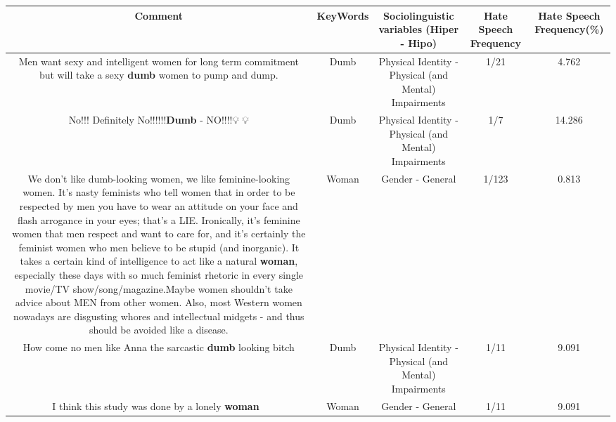 \documentclass[11pt]{article}
\newlength\mylength
\begin{document}
\begin{center}
\setlength\mylength{\dimexpr\textwidth - 1\arrayrulewidth - 50\tabcolsep}
\begin{longtable}{|C{.65\mylength}|C{.30\mylength}|C{.12\mylength}|C{.12\mylength}|C{.12\mylength}|}
\hline
\textbf{Comment} & \textbf{KeyWords} & \textbf{Sociolinguistic variables (Hiper - Hipo)}  & \textbf{Hate Speech Frequency} & \textbf{Hate Speech Frequency(\%)} \\
\hline{}\small Men want sexy and intelligent women for long term commitment but will take a sexy \textbf{dumb} women to pump and dump.\normalsize   & Dumb & Physical Identity - Physical (and Mental) Impairments & 1/21 & 4.762 \\  \hline
  \small No!!! Definitely No!!!!!!\textbf{Dumb} - NO!!!!💡🤨💡\normalsize   & Dumb & Physical Identity - Physical (and Mental) Impairments & 1/7 & 14.286 \\  \hline
  \small We don't like dumb-looking women, we like feminine-looking women. It's nasty feminists who tell women that in order to be respected by men you have to wear an attitude on your face and flash arrogance in your eyes; that's a LIE. Ironically, it's feminine women that men respect and want to care for, and it's certainly the feminist women who men believe to be stupid (and inorganic). It takes a certain kind of intelligence to act like a natural \textbf{woman}, especially these days with so much feminist rhetoric in every single movie/TV show/song/magazine.Maybe women shouldn't take advice about MEN from other women. Also, most Western women nowadays are disgusting whores and intellectual midgets - and thus should be avoided like a disease.\normalsize   & Woman & Gender - General & 1/123 & 0.813 \\  \hline
  \small How come no men like Anna the sarcastic \textbf{dumb} looking bitch\normalsize   & Dumb & Physical Identity - Physical (and Mental) Impairments & 1/11 & 9.091 \\  \hline
  \small I think this study was done by a lonely \textbf{woman} 🤔\normalsize   & Woman & Gender - General & 1/11 & 9.091 \\  \hline

\end{longtable}
\end{center}
\end{document}
